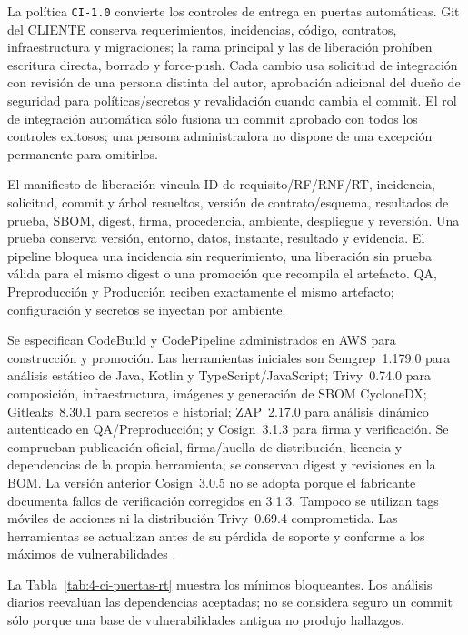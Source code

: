 La política \texttt{CI-1.0} convierte los controles de entrega en puertas automáticas. Git del CLIENTE conserva requerimientos, incidencias, código, contratos, infraestructura y migraciones; la rama principal y las de liberación prohíben escritura directa, borrado y force-push. Cada cambio usa solicitud de integración con revisión de una persona distinta del autor, aprobación adicional del dueño de seguridad para políticas/secretos y revalidación cuando cambia el commit. El rol de integración automática sólo fusiona un commit aprobado con todos los controles exitosos; una persona administradora no dispone de una excepción permanente para omitirlos.

El manifiesto de liberación vincula ID de requisito/RF/RNF/RT, incidencia, solicitud, commit y árbol resueltos, versión de contrato/esquema, resultados de prueba, SBOM, digest, firma, procedencia, ambiente, despliegue y reversión. Una prueba conserva versión, entorno, datos, instante, resultado y evidencia. El pipeline bloquea una incidencia sin requerimiento, una liberación sin prueba válida para el mismo digest o una promoción que recompila el artefacto. QA, Preproducción y Producción reciben exactamente el mismo artefacto; configuración y secretos se inyectan por ambiente.

Se especifican CodeBuild y CodePipeline administrados en AWS para construcción y promoción. Las herramientas iniciales son Semgrep~1.179.0 para análisis estático de Java, Kotlin y TypeScript/JavaScript; Trivy~0.74.0 para composición, infraestructura, imágenes y generación de SBOM CycloneDX; Gitleaks~8.30.1 para secretos e historial; ZAP~2.17.0 para análisis dinámico autenticado en QA/Preproducción; y Cosign~3.1.3 para firma y verificación. Se comprueban publicación oficial, firma/huella de distribución, licencia y dependencias de la propia herramienta; se conservan digest y revisiones en la BOM. La versión anterior Cosign~3.0.5 no se adopta porque el fabricante documenta fallos de verificación corregidos en 3.1.3. Tampoco se utilizan tags móviles de acciones ni la distribución Trivy~0.69.4 comprometida. Las herramientas se actualizan antes de su pérdida de soporte y conforme a los máximos de vulnerabilidades \parencites{sec-semgrep,sec-trivy,sec-gitleaks,sec-zap,sec-cosign,sec-cosign-aviso}.

La Tabla~\ref{tab:4-ci-puertas-rt} muestra los mínimos bloqueantes. Los análisis diarios reevalúan las dependencias aceptadas; no se considera seguro un commit sólo porque una base de vulnerabilidades antigua no produjo hallazgos.

